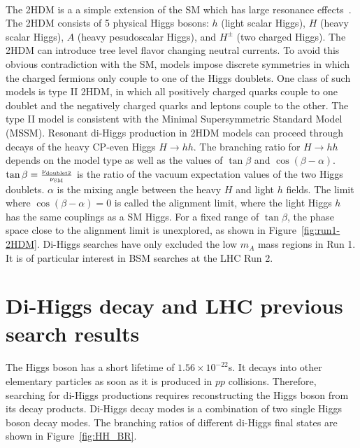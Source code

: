 \paragraph{}
The 2HDM is a a simple extension of the SM which has large resonance effects~\cite{LHCYellow}. 
The 2HDM consists of 5 physical Higgs bosons: $h$ (light scalar Higgs), $H$ (heavy scalar Higgs), $A$ (heavy pesudoscalar Higgs), and $H^{\pm}$ (two charged Higgs). 
The 2HDM can introduce tree level flavor changing neutral currents. 
To avoid this obvious contradiction with the SM, models impose discrete symmetries in which the charged fermions only couple to one of the Higgs doublets.
One class of such models is type II 2HDM, in which all positively charged quarks couple to one doublet and the negatively charged quarks and leptons couple to the other. 
The type II model is consistent with the Minimal Supersymmetric Standard Model (MSSM).
Resonant di-Higgs production in 2HDM models can proceed through decays of the heavy CP-even Higgs $H\to hh$. 
The branching ratio for $H\to hh$ depends on the model type as well as the values of $\tan{\beta}$ and $\cos(\beta - \alpha)$. 
$\tan{\beta} = \frac{\rm \nu_{\rm doublet2}}{\rm \nu_{SM}}$ is the ratio of the vacuum expectation values of the two Higgs doublets. 
$\alpha$ is the mixing angle between the heavy $H$ and light $h$ fields. 
The limit where $\cos(\beta - \alpha) = 0$ is called the alignment limit, where the light Higgs $h$ has the same couplings as a SM Higgs.
For a fixed range of $\tan{\beta}$, the phase space close to the alignment limit is unexplored, as shown in Figure~\ref{fig:run1-2HDM}.
Di-Higgs searches have only excluded the low $m_A$ mass regions in Run 1.
It is of particular interest in BSM searches at the LHC Run 2.


\section{Di-Higgs decay and LHC previous search results}
\label{sec:hhdecay}
\paragraph{}
The Higgs boson has a short lifetime of $1.56 \times 10^{-22}$s.
It decays into other elementary particles as soon as it is produced in $pp$ collisions. 
Therefore, searching for di-Higgs productions requires reconstructing the Higgs boson from its decay products.
Di-Higgs decay modes is a combination of two single Higgs boson decay modes. 
The branching ratios of different di-Higgs final states are shown in Figure~\ref{fig:HH_BR}.

